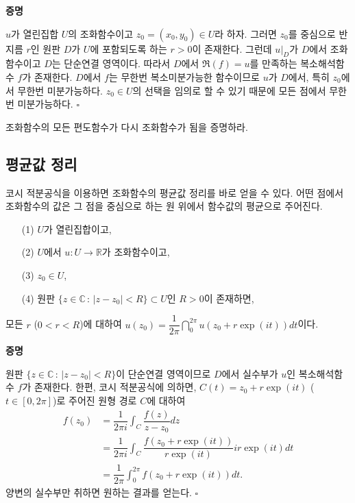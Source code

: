 {\bf 증명}

$u$가 열린집합 $U$의 조화함수이고 $z_0=(x_0,y_0) \in U$라 하자.
그러면 $z_0$를 중심으로 반지름 $r$인 원판 $D$가 $U$에  포함되도록 하는 $r>0$이 존재한다.
그런데 $u|_D$가 $D$에서 조화함수이고 $D$는 단순연결 영역이다.
따라서 $D$에서 $\Re(f)=u$를 만족하는 복소해석함수 $f$가 존재한다.
$D$에서 $f$는 무한번 복소미분가능한 함수이므로
$u$가 $D$에서, 특히 $z_0$에서 무한번 미분가능하다.
$z_0\in U$의 선택을 임의로 할 수 있기 때문에 모든 점에서 무한번 미분가능하다.
\hfill $\square$

\begin{salt_exercise}\label{ex-5-7}
조화함수의 모든 편도함수가 다시 조화함수가 됨을 증명하라.
\end{salt_exercise}

\subsection{평균값 정리}

코시 적분공식을 이용하면
조화함수의 평균값 정리를 바로 얻을 수 있다.
어떤 점에서 조화함수의 값은 그 점을 중심으로 하는 원 위에서 함수값의 평균으로 주어진다.

\begin{salttheorem}  {}{} \label{thm-5-3}

\begin{itemize}
\item[(1)] $U$가 열린집합이고,
\item[(2)] $U$에서 $u:U\to\mathbb R$가 조화함수이고,
\item[(3)] $z_0\in U$,
\item[(4)] 원판 $\{ z\in\mathbb C\,:\, |z-z_0|<R \} \subset U$인 $R>0$이 존재하면,
\end{itemize}
모든 $r$ ($0<r<R$)에 대하여
$u(z_0) = \dfrac1{2\pi} \dint_0^{2\pi} u(z_0 + r\exp(it))dt$이다.
\end{salttheorem}

{\bf 증명}

원판 $\{ z\in\mathbb C\,:\, |z-z_0|<R \} $이 단순연결 영역이므로
$D$에서 실수부가 $u$인 복소해석함수 $f$가 존재한다.
한편, 코시 적분공식에 의하면, 
$C(t) = z_0 + r\exp(it)$ ($t\in[0,2\pi]$)로 주어진 원형 경로 $C$에 대하여 
\begin{align*}
f(z_0) &= \dfrac1{2\pi i} \int_C \dfrac{f(z)}{z-z_0} dz \\
&= \dfrac1{2\pi i} \int_C \dfrac{f(z_0+r\exp(it))}{r\exp(it)} ir\exp(it) dt\\
&= \dfrac1{2\pi} \int_0^{2\pi} f(z_0+r\exp(it)) dt.
\end{align*}
양변의 실수부만 취하면 원하는 결과를 얻는다.
\hfill $\square$

